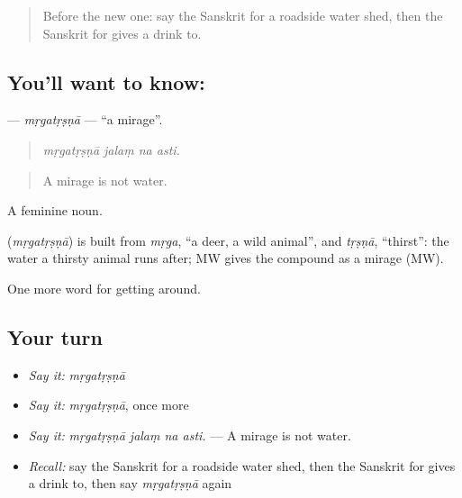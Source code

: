 \begin{quote}
Before the new one: say the Sanskrit for a roadside water shed, then the Sanskrit for gives a drink to.
\end{quote}

\subsection*{You'll want to know: }
\textbf{} — \emph{mṛgatṛṣṇā} — \textquotedblleft{}a mirage\textquotedblright{}.

\begin{quote}
   
\end{quote}

\begin{quote}
\emph{mṛgatṛṣṇā jalaṃ na asti.}
\end{quote}

\begin{quote}
A mirage is not water.
\end{quote}

A feminine noun.

\begin{cousinweb}
\textbf{} (\emph{mṛgatṛṣṇā}) is built from \emph{mṛga}, \textquotedblleft{}a deer, a wild animal\textquotedblright{}, and \emph{tṛṣṇā}, \textquotedblleft{}thirst\textquotedblright{}: the water a thirsty animal runs after; MW gives the compound as a mirage (MW).
\end{cousinweb}

\begin{grammarlens}[title={What you've built}]
One more word for getting around.
\end{grammarlens}

\subsection*{Your turn}
\begin{itemize}
\raggedright
  \item \emph{Say it:} \emph{mṛgatṛṣṇā}
  \item \emph{Say it:} \emph{mṛgatṛṣṇā}, once more
  \item \emph{Say it:} \emph{mṛgatṛṣṇā jalaṃ na asti.} — A mirage is not water.
  \item \emph{Recall:} say the Sanskrit for a roadside water shed, then the Sanskrit for gives a drink to, then say \emph{mṛgatṛṣṇā} again
\end{itemize}

